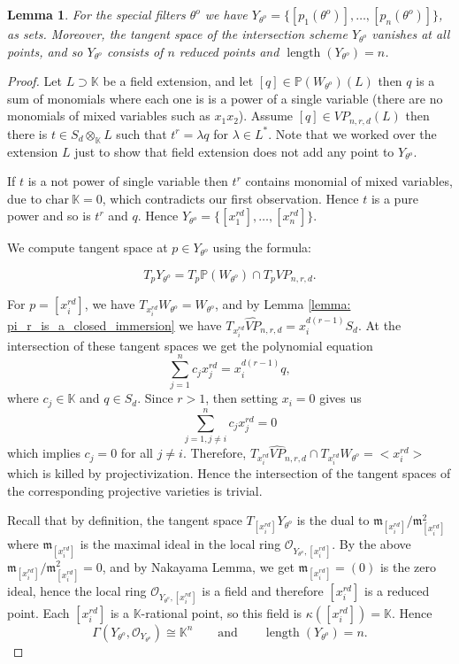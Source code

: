\documentclass[final]{article}
\newcommand{\K}{\mathbb{K}}
\newcommand{\PP}{\mathbb{P}}
\theoremstyle{definition}
\theoremstyle{plain}
\newtheorem{lemma}[definition]{Lemma}
\begin{document}
\begin{lemma}\label{lemma: the_fiber_at_identity_filters_has_length_n}
    For the special filters $\theta^o$ we have $Y_{\theta^o} = \{[p_1(\theta^o)], \dots, [p_n(\theta^o)]\}$, as sets. 
    Moreover, the tangent space of the intersection scheme $Y_{\theta^o}$ vanishes at all points, and so $Y_{\theta^o}$ consists of $n$ reduced points and $\operatorname{length} (Y_{\theta^o}) = n$. 
\end{lemma}
\begin{proof}
    Let $L\supset \K$ be a field extension, and let $[q] \in \mathbb{P}(W_{\theta^o})(L)$ then $q$ is a sum of monomials where each one is is a power of a single variable (there are no monomials of mixed variables such as $x_1 x_2$). 
    Assume $[q] \in VP_{n, r, d}(L)$ then there is $t\in S_d \otimes_\K L$ such that $t^r = \lambda q$ for $\lambda \in L^*$. 
    Note that we worked over the extension $L$ just to show that field extension does not add any point to $Y_{\theta^o}$.
    
    If $t$ is a not power of single variable then $t^r$ contains monomial of mixed variables, due to $\text{char}\ \K = 0$, which contradicts our first observation. Hence $t$ is a pure power and so is $t^r$ and $q$. Hence $Y_{\theta^o} = \{[x_1^{rd}], \dots, [x_n^{rd}]\}$.

    We compute tangent space at $p \in Y_{\theta^o}$ using the formula:

    \[
    T_pY_{\theta^o} = T_p\PP(W_{\theta^o}) \cap T_pVP_{n,r,d}.
    \]
    
    For $p= [x_i^{rd}]$, we have $T_{x_i^{rd}} W_{\theta^o} = W_{\theta^o}$, and by Lemma \ref{lemma: pi_r_is_a_closed_immersion} we have $T_{x_i^{rd}}\widehat{VP}_{n, r, d} = x_i^{d(r-1)} S_d$.
    At the intersection of these tangent spaces we get the  polynomial equation
    \[
    \sum_{j=1}^n c_j x_j^{rd} = x_i^{d(r-1)} q,
    \]
    where $c_j \in \K$ and $q\in S_d$. Since $r > 1$, then setting $x_i = 0$ gives us 
    \[
    \sum_{j=1, j\neq i}^n c_j x_j^{rd} = 0
    \]
    which implies $c_j = 0$ for all $j\neq i$. Therefore,
    $T_{x_i^{rd}}\widehat{VP}_{n, r, d} \cap T_{x_i^{rd}} W_{\theta^o} = <x_i^{rd}>$ which is killed by projectivization. Hence the intersection of the tangent spaces of the corresponding projective varieties is trivial.

    Recall that by definition, the tangent space $T_{[x_i^{rd}]}Y_{\theta^o}$ is the dual to $\mathfrak{m}_{[x_i^{rd}]}/\mathfrak{m}_{[x_i^{rd}]}^2$ where  $\mathfrak{m}_{[x_i^{rd}]}$ is the maximal ideal in the local ring $\mathcal{O}_{Y_{\theta^o}, [x_i^{rd}]}$.
    By the above $\mathfrak{m}_{[x_i^{rd}]}/\mathfrak{m}_{[x_i^{rd}]}^2 = 0$, and by Nakayama Lemma, we get $\mathfrak{m}_{[x_i^{rd}]} = (0)$ is the zero ideal, hence the local ring  $\mathcal{O}_{Y_{\theta^o}, [x_i^{rd}]}$ is a field and therefore $[x_i^{rd}]$ is a reduced point. 
    Each $[x_i^{rd}]$ is a $\K$-rational point, so this field is
$\kappa([x_i^{rd}]) = \K$. Hence
\[
\Gamma(Y_{\theta^o}, \mathcal{O}_{Y_{\theta^o}}) \cong \K^n
\qquad\text{and}\qquad
\operatorname{length}(Y_{\theta^o}) = n .
\]
\end{proof}
\end{document}

